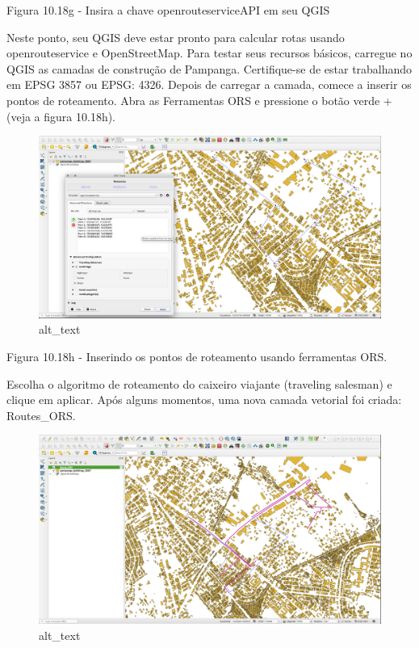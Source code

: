 \documentclass[
  portuguese,
]{krantz}
\begin{document}
Figura 10.18g - Insira a chave openrouteserviceAPI em seu QGIS

Neste ponto, seu QGIS deve estar pronto para calcular rotas usando openrouteservice e OpenStreetMap. Para testar seus recursos básicos, carregue no QGIS as camadas de construção de Pampanga. Certifique-se de estar trabalhando em EPSG 3857 ou EPSG: 4326. Depois de carregar a camada, comece a inserir os pontos de roteamento. Abra as Ferramentas ORS e pressione o botão verde + (veja a figura 10.18h).

\begin{figure}
\centering
\includegraphics{media/modulo10/fig1018_h.png}
\caption{alt\_text}
\end{figure}

Figura 10.18h - Inserindo os pontos de roteamento usando ferramentas ORS.

Escolha o algoritmo de roteamento do caixeiro viajante (traveling salesman) e clique em aplicar. Após alguns momentos, uma nova camada vetorial foi criada: Routes\_ORS.

\begin{figure}
\centering
\includegraphics{media/modulo10/fig1018_i.png}
\caption{alt\_text}
\end{figure}
\end{document}
